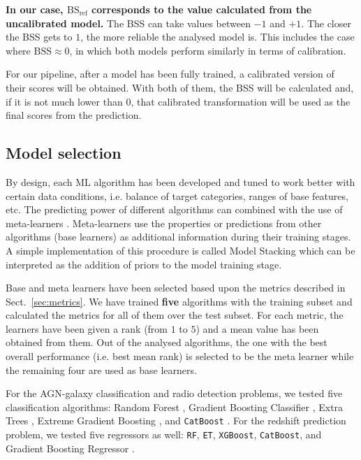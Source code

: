 \documentclass{aa}
\begin{document}
\textbf{In our case, $\mathrm{BS}_{\mathrm{ref}}$ corresponds to the value calculated from the uncalibrated model.} The BSS can take values between $-1$ and $+1$. The closer the BSS gets to $1$, the more reliable the analysed model is. This includes the case where ${\mathrm{BSS} {\approx} 0}$, in which both models perform similarly in terms of calibration.

For our pipeline, after a model has been fully trained, a calibrated version of their scores will be obtained. With both of them, the BSS will be calculated and, if it is not much lower than $0$, that calibrated transformation will be used as the final scores from the prediction.

\subsection{Model selection}\label{sec:model_selection}

By design, each ML algorithm has been developed and tuned to work better with certain data conditions, i.e. balance of target categories, ranges of base features, etc. 
The predicting power of different algorithms can combined with the use of  meta-learners \citep{Vanschoren2019}. Meta-learners use the properties or predictions from other algorithms (base learners) as additional information during their training stages. A simple implementation of this procedure is called Model Stacking \citep{WOLPERT1992241} which can be interpreted
as the addition of priors to the model training stage.

Base and meta learners have been selected based upon the metrics described in Sect.~\ref{sec:metrics}. We have trained \textbf{five} algorithms with the training subset and calculated the metrics for all of them over the test subset. For each metric, the learners have been given a rank (from $1$ to $5$) and a mean value has been obtained from them. Out of the analysed algorithms, the one with the best overall performance (i.e. best mean rank) is selected to be the meta learner while the remaining four are used as base learners.

For the AGN-galaxy classification and radio detection problems, we tested five classification algorithms: Random Forest \citep[\texttt{RF};][]{Breiman2001}, Gradient Boosting Classifier \citep[\texttt{GBC};][]{10.1214/aos/1013203451}, Extra Trees \citep[\texttt{ET};][]{Geurts2006}, Extreme Gradient Boosting \citep[\texttt{XGBoost}, \texttt{v1.5.1};][]{Chen:2016:XST:2939672.2939785}, and \texttt{CatBoost} \citep[\texttt{v1.0.5};][]{DBLP:journals/corr/DorogushGGKPV17, DBLP:journals/corr/abs-1810-11363}.
For the redshift prediction problem, we tested five regressors as well: \texttt{RF}, \texttt{ET}, \texttt{XGBoost}, \texttt{CatBoost}, and Gradient Boosting Regressor \citep[\texttt{GBR};][]{10.1214/aos/1013203451}.
\end{document}
